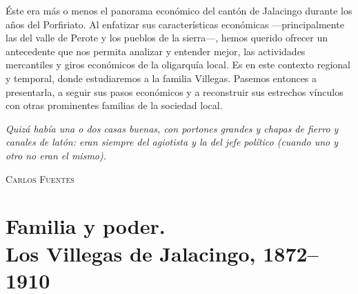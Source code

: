 \documentclass[14pt,twoside,final]{extbook} %
\begin{document}
Éste era más o menos el panorama económico del cantón de Jalacingo durante los años del Porfiriato. Al enfatizar sus características económicas ---principalmente las del valle de Perote y los pueblos de la sierra---, hemos querido ofrecer un antecedente que nos permita analizar y entender mejor, las actividades mercantiles y giros económicos de la oligarquía local. Es en este contexto regional y temporal, donde estudiaremos a la familia Villegas. Pasemos entonces a presentarla, a seguir sus pasos económicos y a reconstruir sus estrechos vínculos con otras prominentes familias de la sociedad local.
\newpage
\pagestyle{empty}
\begin{flushright}
\begin{minipage}{8cm}
\emph{Quizá había una o dos casas buenas, con portones grandes y chapas de fierro y canales de latón: eran siempre del agiotista y la del jefe político (cuando uno y otro no eran el mismo).}
\end{minipage}
\end{flushright}
\begin{flushright}
\textsc{Carlos Fuentes}
\end{flushright}
\chapter[Familia y poder. Los Villegas de Jalacingo, 1872--1910]{Familia y poder. \\ Los Villegas de Jalacingo, 1872--1910}
\label{ch:capitulo-dos}
\thispagestyle{empty}
\pagestyle{fancy}
\fancyhf{} %
\fancyhead[RO,LE]{\iffloatpage{}{\thepage}}
\renewcommand\headrulewidth{\iffloatpage{0pt}{0pt}}
\end{document}

